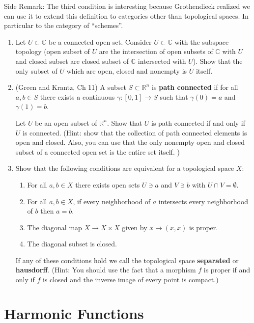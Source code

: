 \documentclass[a4paper,10pt]{article}
\newcommand{\RR}{\mathbb{R}}
\newcommand{\CC}{\mathbb{C}}
\begin{document}
Side Remark: The third condition is interesting because Grothendieck realized we can use it to extend this definition to categories other than topological spaces. In particular to the category of ``schemes''.

\begin{enumerate}
	\item Let $U \subset \CC$ be a connected open set. Consider $U\subset \CC$ with the subspace topology (open subset of $U$ are the intersection of open subsets of $\CC$ with $U$ and closed subset are closed subset of $\CC$ intersected with $U$). Show that the only subset of $U$ which are open, closed and nonempty is $U$ itself. 
	
	\item (Green and Krantz, Ch 11) A subset $S \subset \RR^n$ is \textbf{path connected} if for all $a,b \in S$ there exists a continuous $\gamma: [0,1] \to S$ such that $\gamma(0) = a$ and $\gamma(1) = b$. 
	
	Let $U$ be an open subset of $\RR^n$. Show that $U$ is path connected if and only if $U$ is connected. (Hint: show that the collection of path connected elements is open and closed. Also, you can use that the only nonempty open and closed subset of a connected open set is the entire set itself. )
	\item 
	Show that the following conditions are equivalent for a topological space $X$:
	\begin{enumerate}
		\item For all $a,b \in X$ there exists open sets $U \owns a$ and $V \owns b$ with $U \cap V = \emptyset$. 
		\item For all $a,b\in X$, if every neighborhood of $a$ intersects every neighborhood of $b$ then $a = b$.
		\item The diagonal map $X \to X\times X$ given by $x\mapsto (x,x)$ is proper. 
		\item The diagonal subset is closed. 
	\end{enumerate}
	
	
	If any of these conditions hold we call the topological space \textbf{separated} or \textbf{hausdorff}. (Hint: You should use the fact that a morphism $f$ is proper if and only if $f$ is closed and the inverse image of every point is compact.)
	
\end{enumerate}


\section{Harmonic Functions}
\end{document}
